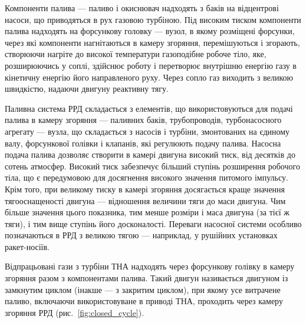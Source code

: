 Компоненти палива --- паливо і окиснювач надходять з баків на відцентрові насоси, що приводяться в рух газовою турбіною. Під високим тиском компоненти палива надходять на форсункову головку  --- вузол, в якому розміщені форсунки, через які компоненти нагнітаються в камеру згоряння, перемішуються і згорають, створюючи нагріте до високої температури газоподібне робоче тіло, яке, розширюючись у соплі, здійснює роботу і перетворює внутрішню енергію газу в кінетичну енергію його направленого руху. Через сопло газ виходить з великою швидкістю, надаючи двигуну реактивну тягу.

Паливна система РРД складається з елементів, що використовуються для подачі палива в камеру згоряння — паливних баків, трубопроводів, турбонасосного агрегату — вузла, що складається з насосів і турбіни, змонтованих на єдиному валу, форсункової голівки і клапанів, які регулюють подачу палива. Насосна подача палива дозволяє створити в камері двигуна високий тиск, від десятків до сотень атмосфер. Високий тиск забезпечує більший ступінь розширення робочого тіла, що є передумовою для досягнення високого значення питомого імпульсу. Крім того, при великому тиску в камері згоряння досягається краще значення тягооснащеності двигуна — відношення величини тяги до маси двигуна. Чим більше значення цього показника, тим менше розміри і маса двигуна (за тієї ж тяги), і тим вище ступінь його досконалості. Переваги насосної системи особливо позначаються в РРД з великою тягою --- наприклад, у рушійних установках ракет-носіїв.

Відпрацьовані гази з турбіни ТНА надходять через форсункову голівку в камеру згоряння разом з компонентами палива. Такий двигун називається двигуном із замкнутим циклом (інакше — з закритим циклом), при якому усе витрачене паливо, включаючи використовуване в приводі ТНА, проходить через камеру згоряння РРД (рис.~\ref{fig:closed_cycle}).

